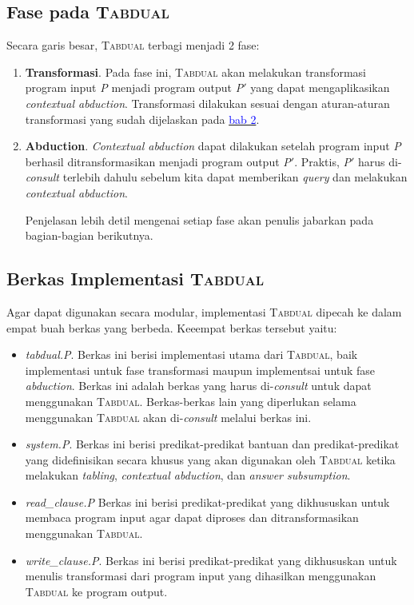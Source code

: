 \subsection{Fase pada \textsc{Tabdual}}

Secara garis besar, \textsc{Tabdual} terbagi menjadi 2 fase:

\begin{enumerate}
	\item \textbf{Transformasi}. Pada fase ini, \textsc{Tabdual} akan melakukan transformasi program input \textit{P} menjadi program output \textit{P$'$} yang dapat mengaplikasikan \textit{contextual abduction}. Transformasi dilakukan sesuai dengan aturan-aturan transformasi yang sudah dijelaskan pada \hyperref[bab2]{\textcolor{blue}{bab 2}}.
	\item \textbf{Abduction}. \textit{Contextual abduction} dapat dilakukan setelah program input \textit{P} berhasil ditransformasikan menjadi program output \textit{P$'$}. Praktis, \textit{P$'$} harus di-\textit{consult} terlebih dahulu sebelum kita dapat memberikan \textit{query} dan melakukan \textit{contextual abduction}.
	
	Penjelasan lebih detil mengenai setiap fase akan penulis jabarkan pada bagian-bagian berikutnya.
\end{enumerate}

\subsection{Berkas Implementasi \textsc{Tabdual}}
Agar dapat digunakan secara modular, implementasi \textsc{Tabdual} dipecah ke dalam empat buah berkas yang berbeda. Keeempat berkas tersebut yaitu:

\begin{itemize}
	\item \textit{tabdual.P}. Berkas ini berisi implementasi utama dari \textsc{Tabdual}, baik implementasi untuk fase transformasi maupun implementsai untuk fase \textit{abduction}. Berkas ini adalah berkas yang harus di-\textit{consult} untuk dapat menggunakan \textsc{Tabdual}. Berkas-berkas lain yang diperlukan selama menggunakan \textsc{Tabdual} akan di-\textit{consult} melalui berkas ini.
	\item \textit{system.P}. Berkas ini berisi predikat-predikat bantuan dan predikat-predikat yang didefinisikan secara khusus yang akan digunakan  oleh \textsc{Tabdual} ketika melakukan \textit{tabling}, \textit{contextual abduction}, dan \textit{answer subsumption}. 
	\item \textit{read\_clause.P} Berkas ini berisi predikat-predikat yang dikhususkan untuk membaca program input agar dapat diproses dan ditransformasikan menggunakan \textsc{Tabdual}.
	\item \textit{write\_clause.P}. Berkas ini berisi predikat-predikat yang dikhususkan untuk menulis transformasi dari program input yang dihasilkan menggunakan \textsc{Tabdual} ke program output.
\end{itemize}

